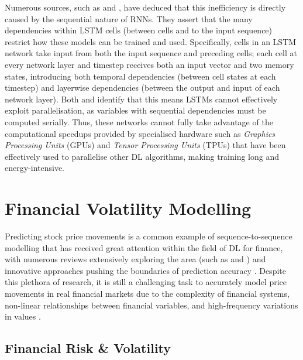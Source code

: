\documentclass[a4paper, 11pt]{report}
\begin{document}
    Numerous sources, such as \citet{cao-2017} and \citet{feliz-2021}, have deduced that this inefficiency is directly caused by the sequential nature of RNNs. They assert that the many dependencies within LSTM cells (between cells and to the input sequence) restrict how these models can be trained and used. Specifically, cells in an LSTM network take input from both the input sequence and preceding cells; each cell at every network layer and timestep receives both an input vector and two memory states, introducing both temporal dependencies (between cell states at each timestep) and layerwise dependencies (between the output and input of each network layer). Both \citet{cao-2017} and \citet{feliz-2021} identify that this means LSTMs cannot effectively exploit parallelisation, as variables with sequential dependencies must be computed serially. Thus, these networks cannot fully take advantage of the computational speedups provided by specialised hardware such as \emph{Graphics Processing Units} (GPUs) and \emph{Tensor Processing Units} (TPUs) that have been effectively used to parallelise other DL algorithms, making training long and energy-intensive.


    \section{Financial Volatility Modelling}

    Predicting stock price movements is a common example of sequence-to-sequence modelling that has received great attention within the field of DL for finance, with numerous reviews extensively exploring the area (such as \citet{sezer-2019} and \citet{jiang-2021}) and innovative approaches pushing the boundaries of prediction accuracy \citep{darapaneni-2022}. Despite this plethora of research, it is still a challenging task to accurately model price movements in real financial markets due to the complexity of financial systems, non-linear relationships between financial variables, and high-frequency variations in values \citep{timmermann-2004}.


    \subsection{Financial Risk \& Volatility}
\end{document}
